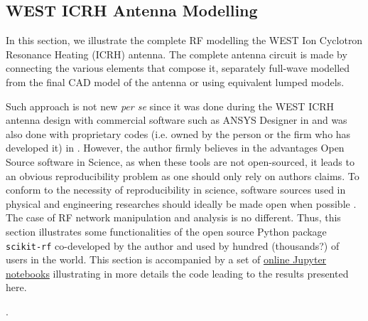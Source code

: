 {\clearpage

\subsection{WEST ICRH Antenna Modelling}\label{sec:WEST_ICRH_antenna_modelling}
In this section, we illustrate the complete RF modelling the WEST Ion Cyclotron Resonance Heating (ICRH) antenna. The complete antenna circuit is made by connecting the various elements that compose it, separately full-wave modelled from the final CAD model of the antenna or using equivalent lumped models. 

Such approach is not new \textit{per se} since it was done during the WEST ICRH antenna design with commercial software such as ANSYS Designer in  and was also done with proprietary codes (i.e. owned by the person or the firm who has developed it) in . However, the author firmly believes in the advantages Open Source software in Science, as when these tools are not open-sourced, it leads to an obvious reproducibility problem as one should only rely on authors claims. To conform to the necessity of reproducibility in science,  software sources used in physical and engineering researches should ideally be made open when possible . The case of RF network manipulation and analysis is no different. Thus, this section illustrates some functionalities of the open source Python package \texttt{scikit-rf} co-developed by the author and used by hundred (thousands?) of users in the world. This section is accompanied by a set of  \href{https://doi.org/10.5281/zenodo.2668370}{online Jupyter notebooks} illustrating in more details the code leading to the results presented here.




. 


}
